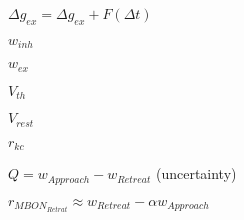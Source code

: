 $\Delta g_{ex} = \Delta g_{ex} + F(\Delta t)$

$w_{inh}$

$w_{ex}$

$V_{th}$

$V_{rest}$

$r_{kc}$

$Q = w_{Approach} - w_{Retreat}$ (uncertainty)


$r_{MBON_{Retrat}} \approx w_{Retreat} - \alpha w_{Approach} $